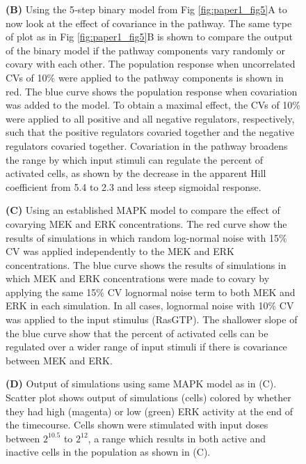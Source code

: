 \begin{figure}[hbt!]
{\textbf{(B)} Using the 5‐step binary model from Fig \ref{fig:paper1_fig5}A to now look at the effect of covariance in the pathway. The same type of plot as in Fig \ref{fig:paper1_fig5}B is shown to compare the output of the binary model if the pathway components vary randomly or covary with each other. The population response when uncorrelated CVs of 10\% were applied to the pathway components is shown in red. The blue curve shows the population response when covariation was added to the model. To obtain a maximal effect, the CVs of 10\% were applied to all positive and all negative regulators, respectively, such that the positive regulators covaried together and the negative regulators covaried together. Covariation in the pathway broadens the range by which input stimuli can regulate the percent of activated cells, as shown by the decrease in the apparent Hill coefficient from 5.4 to 2.3 and less steep sigmoidal response.

\textbf{(C)} Using an established MAPK model \cite{Sturm2010} to compare the effect of covarying MEK and ERK concentrations. The red curve show the results of simulations in which random log-normal noise with 15\% CV was applied independently to the MEK and ERK concentrations. The blue curve shows the results of simulations in which MEK and ERK concentrations were made to covary by applying the same 15\% CV lognormal noise term to both MEK and ERK in each simulation. In all cases, lognormal noise with 10\% CV was applied to the input stimulus (RasGTP). The shallower slope of the blue curve show that the percent of activated cells can be regulated over a wider range of input stimuli if there is covariance between MEK and ERK.

\textbf{(D)} Output of simulations using same MAPK model as in (C). Scatter plot shows output of simulations (cells) colored by whether they had high (magenta) or low (green) ERK activity at the end of the timecourse. Cells shown were stimulated with input doses between $2^{10.5}$ to $2^{12}$, a range which results in both active and inactive cells in the population as shown in (C).
}
\label{fig:paper1_fig7}
\end{figure}

